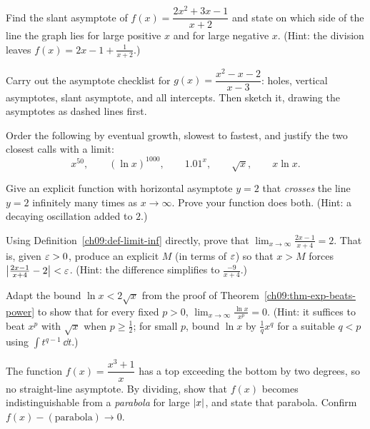 \begin{exercise}
Find the slant asymptote of $f(x)=\dfrac{2x^2+3x-1}{x+2}$ and state on which side
of the line the graph lies for large positive $x$ and for large negative $x$.
(Hint: the division leaves $f(x)=2x-1+\frac{1}{x+2}$.)
\end{exercise}

\begin{exercise}
Carry out the asymptote checklist for $g(x)=\dfrac{x^2-x-2}{x-3}$: holes,
vertical asymptotes, slant asymptote, and all intercepts. Then sketch it,
drawing the asymptotes as dashed lines first.
\end{exercise}

\begin{exercise}
Order the following by eventual growth, slowest to fastest, and justify the two
closest calls with a limit:
\[
   x^{50},\qquad (\ln x)^{1000},\qquad 1.01^{x},\qquad \sqrt{x},\qquad x\ln x.
\]
\end{exercise}

\begin{exercise}
Give an explicit function with horizontal asymptote $y=2$ that \emph{crosses}
the line $y=2$ infinitely many times as $x\to\infty$. Prove your function does
both. (Hint: a decaying oscillation added to $2$.)
\end{exercise}

\begin{exercise}
Using Definition~\ref{ch09:def-limit-inf} directly, prove that
$\displaystyle\lim_{x\to\infty}\frac{2x-1}{x+4}=2$. That is, given $\varepsilon>0$,
produce an explicit $M$ (in terms of $\varepsilon$) so that $x>M$ forces
$\bigl|\frac{2x-1}{x+4}-2\bigr|<\varepsilon$. (Hint: the difference simplifies to
$\frac{-9}{x+4}$.)
\end{exercise}

\begin{exercise}
Adapt the bound $\ln x< 2\sqrt x$ from the proof of
Theorem~\ref{ch09:thm-exp-beats-power} to show that for every fixed $p>0$,
$\displaystyle\lim_{x\to\infty}\frac{\ln x}{x^{p}}=0$. (Hint: it suffices to
beat $x^p$ with $\sqrt x$ when $p\ge \tfrac12$; for small $p$, bound $\ln x$ by
$\tfrac{1}{q}x^{q}$ for a suitable $q<p$ using $\int t^{q-1}\,\dd t$.)
\end{exercise}

\begin{exercise}
The function $f(x)=\dfrac{x^3+1}{x}$ has a top exceeding the bottom by two
degrees, so no straight-line asymptote. By dividing, show that $f(x)$ becomes
indistinguishable from a \emph{parabola} for large $\lvert x\rvert$, and state that
parabola. Confirm $f(x)-(\text{parabola})\to 0$.
\end{exercise}


